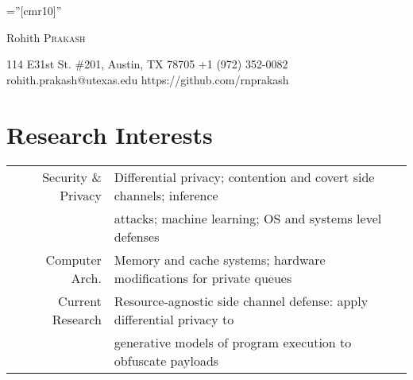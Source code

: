 \documentclass[a4paper,10pt, margin=2in]{article}
\begin{document}
\pagestyle{empty} %

\font\fb=''[cmr10]'' %

\par{\centering
		{\Huge Rohith \textsc{Prakash}
	}\bigskip\par}


114 E31st St. \#201, Austin, TX 78705  \hfill{+1 (972) 352-0082}  \\
rohith.prakash@utexas.edu \hfill{https://github.com/rnprakash}


\section{Research Interests}
\begin{tabular}{rl}
Security \& Privacy & Differential privacy; contention and covert side channels; inference\\
~&  attacks; machine learning;  OS and systems level defenses\\
Computer Arch. & Memory and cache systems; hardware modifications for private queues \\
Current Research & Resource-agnostic side channel defense: apply differential privacy to \\
~&generative models of program execution to obfuscate payloads
\end{tabular}
	
\end{document}
